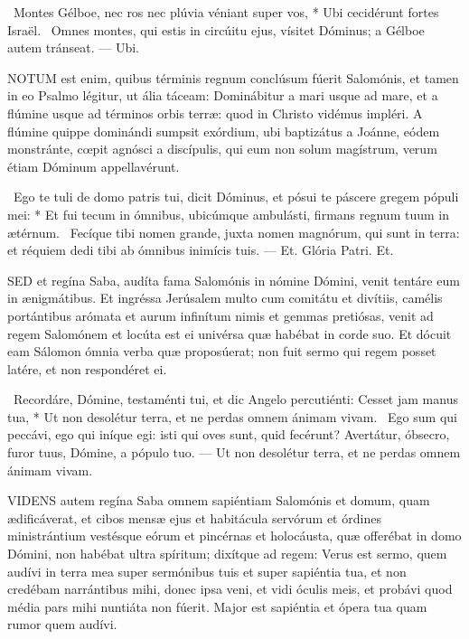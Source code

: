 \R\ Montes Gélboe, nec ros nec plúvia véniant super vos, * Ubi cecidérunt fortes Israël. \V\ Omnes montes, qui estis in circúitu ejus, vísitet Dóminus; a Gélboe autem tránseat. --- Ubi.


\lettrine[lines=2]{N}{OTUM} est enim, quibus términis regnum conclúsum fúerit Salomónis, et tamen in eo Psalmo légitur, ut ália táceam: Dominábitur a mari usque ad mare, et a flúmine usque ad términos orbis terræ: quod in Christo vidémus impléri. A flúmine quippe dominándi sumpsit exórdium, ubi baptizátus a Joánne, eódem monstránte, cœpit agnósci a discípulis, qui eum non solum magístrum, verum étiam Dóminum appellavérunt.

\R\ Ego te tuli de domo patris tui, dicit Dóminus, et pósui te páscere gregem pópuli mei: * Et fui tecum in ómnibus, ubicúmque ambulásti, firmans regnum tuum in ætérnum. \V\ Fecíque tibi nomen grande, juxta nomen magnórum, qui sunt in terra: et réquiem dedi tibi ab ómnibus inimícis tuis. --- Et. Glória Patri. Et.





\lettrine[lines=2]{S}{ED} et regína Saba, audíta fama Salomónis in nómine Dómini, venit tentáre eum in ænigmátibus. Et ingréssa Jerúsalem multo cum comitátu et divítiis, camélis portántibus arómata et aurum infinítum nimis et gemmas pretiósas, venit ad regem Salomónem et locúta est ei univérsa quæ habébat in corde suo. Et dócuit eam Sálomon ómnia verba quæ proposúerat; non fuit sermo qui regem posset latére, et non respondéret ei.

\R\ Recordáre, Dómine, testaménti tui, et dic Angelo percutiénti: Cesset jam manus tua, * Ut non desolétur terra, et ne perdas omnem ánimam vivam. \V\ Ego sum qui peccávi, ego qui iníque egi: isti qui oves sunt, quid fecérunt? Avertátur, óbsecro, furor tuus, Dómine, a pópulo tuo. --- Ut non desolétur terra, et ne perdas omnem ánimam vivam.


\lettrine[lines=2]{V}{IDENS} autem regína Saba omnem sapiéntiam Salomónis et domum, quam ædificáverat, et cibos mensæ ejus et habitácula servórum et órdines ministrántium vestésque eórum et pincérnas et holocáusta, quæ offerébat in domo Dómini, non habébat ultra spíritum; dixítque ad regem: Verus est sermo, quem audívi in terra mea super sermónibus tuis et super sapiéntia tua, et non credébam narrántibus mihi, donec ipsa veni, et vidi óculis meis, et probávi quod média pars mihi nuntiáta non fúerit. Major est sapiéntia et ópera tua quam rumor quem audívi.

